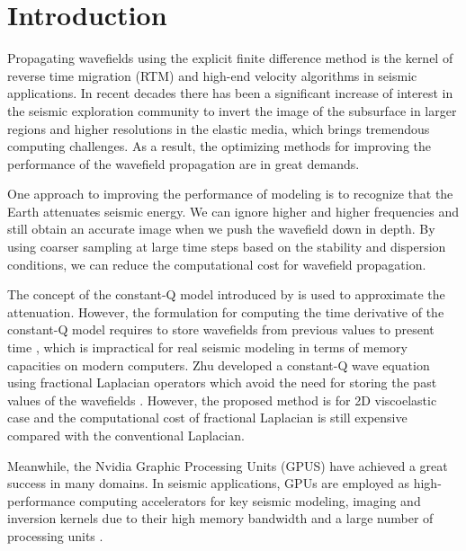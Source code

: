 \documentclass{paris17}
\begin{document}
\section{Introduction}

Propagating wavefields using the explicit finite difference method is the kernel of reverse time migration (RTM) and high-end velocity algorithms in seismic applications. In recent decades there has been a significant increase of interest in the seismic exploration community to invert the image of the subsurface in larger regions and higher resolutions in the elastic media, which brings tremendous computing challenges. As a result, the optimizing methods for improving the performance of the wavefield propagation are in great demands.




One approach to improving the performance of modeling is to recognize that the Earth attenuates seismic energy. We can ignore higher and higher frequencies and still obtain an accurate image\cite[]{Clapp.sep.111.bob3} when we push the wavefield down in depth. By using coarser sampling at large time steps based on the stability and dispersion conditions, we can reduce the computational cost for wavefield propagation. 

The concept of the constant-Q model introduced by \cite{Kjartansson.sep.23} is used to approximate the attenuation. However, the formulation for computing the time derivative of the constant-Q model requires to store wavefields from previous values to present time \cite[]{podlubny1998fractional}, which is impractical for real seismic modeling in terms of memory capacities on modern computers. Zhu developed a constant-Q wave equation using fractional Laplacian operators which avoid the need for storing the past values of the wavefields \cite[]{zhu2014theory}. However, the proposed method is for 2D viscoelastic case and the computational cost of fractional Laplacian is still expensive compared with the conventional Laplacian.

Meanwhile, the Nvidia Graphic Processing Units (GPUS)  have achieved a great success in many domains. In seismic applications, GPUs are employed as high-performance computing accelerators for key seismic modeling, imaging and inversion kernels due to their high memory bandwidth and a large number of processing units \cite[]{he2015gpu}.
\end{document}
